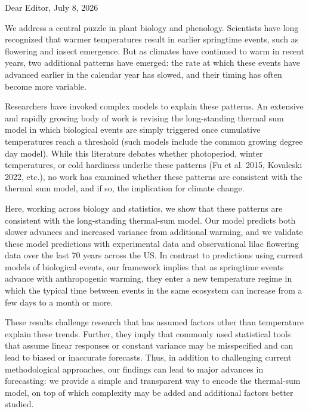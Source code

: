 \documentclass{amsart}
\begin{document}
\thispagestyle{empty}
Dear Editor, \hfill July 8, 2026   \newline \vspace{-.75em}

We address a central puzzle in plant biology and phenology. Scientists have long recognized that warmer temperatures result in earlier springtime events, such as flowering and insect emergence. But as climates have continued to warm in recent years, two additional patterns have emerged: the rate at which these events have advanced earlier in the calendar year has slowed, and their timing has often become more variable.

Researchers have invoked complex models to explain these patterns. An extensive and rapidly growing body of work is revising the long-standing thermal sum model in which biological events are simply triggered once cumulative temperatures reach a threshold (such models include the common growing degree day model). While this literature debates whether photoperiod, winter temperatures, or cold hardiness underlie these patterns (Fu et al. 2015, Kovaleski 2022, etc.), no work has examined whether these patterns are consistent with the thermal sum model, and if so, the implication for climate change.

Here, working across biology and statistics, we show that these patterns are consistent with the long-standing thermal-sum model. Our model predicts both slower advances and increased variance from additional warming, and we validate these model predictions with experimental data and observational lilac flowering data over the last 70 years across the US. In contrast to predictions using current models of biological events, our framework implies that as springtime events advance with anthropogenic warming, they enter a new temperature regime in which the typical time between events in the same ecosystem can increase from a few days to a month or more.

These results challenge research that has assumed factors other than temperature explain these trends. Further, they imply that commonly used statistical tools that assume linear responses or constant variance may be misspecified and can lead to biased or inaccurate forecasts. Thus, in addition to challenging current methodological approaches, our findings can lead to major advances in forecasting: we provide a simple and transparent way to encode the thermal-sum model, on top of which complexity may be added and additional factors better studied.
\end{document}
